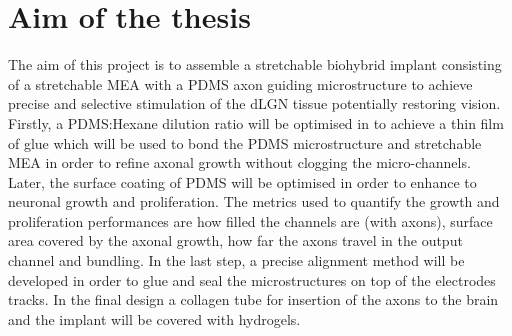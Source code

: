 






\section{Aim of the thesis}
\label{ch:intro:sec:objectives}

 
The aim of this project is to assemble a stretchable biohybrid implant consisting of a stretchable MEA with a PDMS axon guiding microstructure to achieve precise and selective stimulation of the dLGN tissue potentially restoring vision. Firstly, a PDMS:Hexane dilution ratio will be optimised in to achieve a thin film of glue which will be used to bond the PDMS microstructure and stretchable MEA in order to refine axonal growth without clogging the micro-channels. Later, the surface coating of PDMS will be optimised in order to enhance to neuronal growth and proliferation. The metrics used to quantify the growth and proliferation performances are how filled the channels are (with axons), surface area covered by the axonal growth, how far the axons travel in the output channel and bundling. In the last step, a precise alignment method will be developed in order to glue and seal the microstructures on top of the electrodes tracks. In the final design a collagen tube for insertion of the axons to the brain and the implant will be covered with hydrogels.



